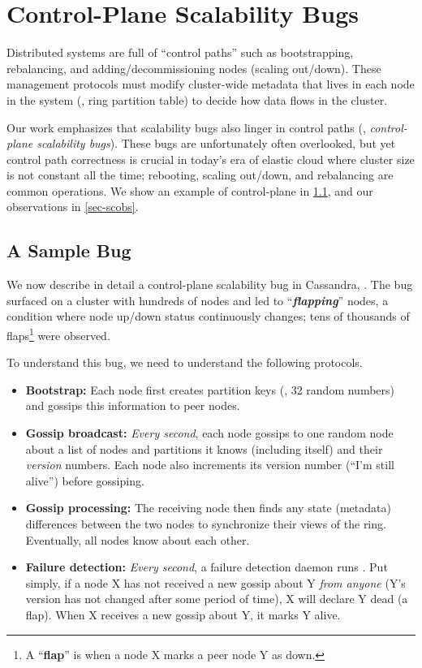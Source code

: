 \section{Control-Plane Scalability Bugs}
\label{bg-sc}

Distributed systems are full of ``control paths'' such as bootstrapping,
rebalancing, and adding/de\-com\-mission\-ing nodes (scaling out/down). These
management protocols must modify cluster-wide metadata that lives in each node
in the system (\eg, ring partition table) to decide how data flows in the
cluster. 

Our work emphasizes that scalability bugs also linger in control paths (\ie,
{\em control-plane scalability bugs}). These bugs are unfortunately often
overlooked, but yet control path correctness is crucial in today's era of
elastic cloud where cluster size is not constant all the time; rebooting,
scaling out/down, and rebalancing are common operations. We show an example of
control-plane in \sec\ref{sec-scbug}, and our observations in
\sec\ref{sec-scobs}.

\subsection{A Sample Bug}
\label{sec-scbug}

We now describe in detail a control-plane scalability bug in Cassandra,
 \cite{CA-One}.
%
The bug surfaced on a cluster with hundreds of nodes and led to
``\textit{\textbf{flapping}}'' nodes, a condition where node up/down status
continuously changes;  tens of thousands of flaps\footnote{A ``\textbf{flap}''
is when a node X marks a peer node Y as down.}  were observed.



To understand this bug, we need to understand the following protocols.
\begin{itemize}
\item {\bf Bootstrap:} Each node first creates partition keys (\eg, 32
random numbers) and gossips this information to peer nodes.
\item {\bf Gossip broadcast:} {\em Every second}, each node gossips to one 
random node about a list of nodes and partitions it knows (including
itself) and their {\em version} numbers.  Each node also increments its 
version number (``I'm still alive'') before gossiping.
\item {\bf Gossip processing:} The receiving node then finds any state
(metadata) differences between the two nodes to synchronize their views of
the ring.  Eventually, all nodes know about each other.
\item {\bf Failure detection:} {\em Every second}, a failure detection
daemon runs \cite{Lakshman+09-Cassandra}.  Put simply, if a node X has not 
received a new gossip about Y {\em from anyone} (Y's version has not 
changed after some period of time), X will declare Y dead (a flap).  When
X receives a new gossip about Y, it marks Y alive.
\end{itemize}

